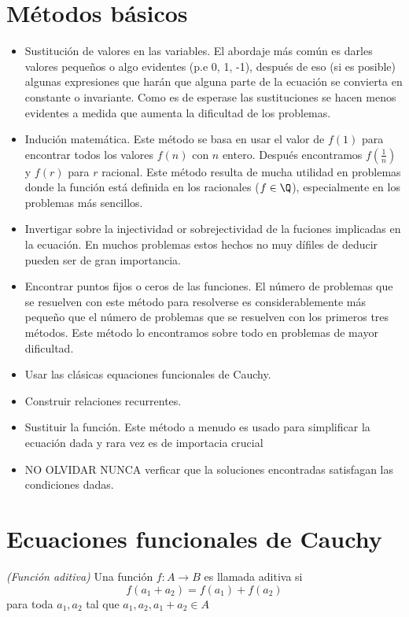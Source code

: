\section{Métodos básicos}
{
    \begin{itemize}
        \item Sustitución de valores en las variables. El abordaje más común es darles valores pequeños o algo evidentes (p.e 0, 1, -1), después de eso (si es posible) algunas expresiones que harán que alguna parte de la ecuación se convierta en constante o invariante. Como es de esperase las sustituciones se hacen menos evidentes a medida que aumenta la dificultad de los problemas.
        \item Indución matemática. Este método se basa en usar el valor de $f(1)$ para encontrar todos los valores $f(n)$ con $n$ entero. Después encontramos $f(\frac{1}{n})$ y $f(r)$ para $r$ racional. Este método resulta de mucha utilidad en problemas donde la función está definida en los racionales ($f \in \Q$), especialmente en los problemas más sencillos.
        \item Invertigar sobre la injectividad or sobrejectividad de la fuciones implicadas en la ecuación. En muchos problemas estos hechos no muy dífiles de deducir pueden ser de gran importancia.
        \item Encontrar puntos fijos o ceros de las funciones. El número de problemas que se resuelven con este método para resolverse es considerablemente más pequeño que el número de problemas que se resuelven con los primeros tres métodos. Este método lo encontramos sobre todo en problemas de mayor dificultad.
        \item Usar las clásicas equaciones funcionales de Cauchy.
        \item Construir relaciones recurrentes.
        \item Sustituir la función. Este método a menudo es usado para simplificar la ecuación dada y rara vez es de importacia crucial
        \item NO OLVIDAR NUNCA verficar que la soluciones encontradas satisfagan las condiciones dadas.
    \end{itemize}
}

\section{Ecuaciones funcionales de Cauchy}
{
    \begin{section-definition}
        \emph{(Función aditiva)} Una función $f: A \rightarrow B$ es llamada aditiva si $$f(a_1+a_2) = f(a_1)+f(a_2)$$
        para toda $a_1, a_2$ tal que $a_1, a_2, a_1+a_2 \in A$
    \end{section-definition}
}